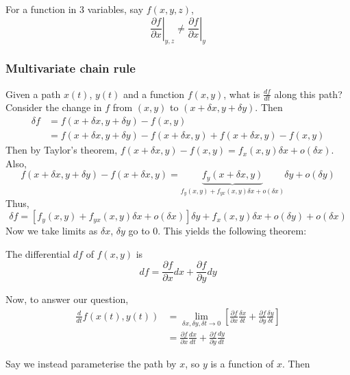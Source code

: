 \documentclass{../../template/note}
\begin{document}
    \begin{remark*}
        For a function in 3 variables, say \(f(x, y, z)\),
        \[
            \left.\frac{\partial f}{\partial x}\right|_{y,z} \neq \left.\frac{\partial f}{\partial x}\right|_y
        \]        
    \end{remark*}
    
    \subsubsection{Multivariate chain rule}

    Given a path \(x(t)\), \(y(t)\) and a function \(f(x, y)\), what is \(\frac{df}{dt}\) along this path? Consider the change in \(f\) from \((x, y)\) to \((x + \delta x, y + \delta y)\). Then
    \begin{align*}
        \delta f &= f(x + \delta x, y + \delta y) - f(x, y) \\
        &= f(x + \delta x, y + \delta y) - f(x + \delta x, y) + f(x + \delta x, y) - f(x, y)
    \end{align*}
    Then by Taylor's theorem, \(f(x + \delta x, y) - f(x, y) = f_x(x, y) \delta x + o(\delta x)\). Also,
    \[
        f(x + \delta x, y + \delta y) - f(x + \delta x, y) = \underbrace{f_y(x + \delta x, y)}_{f_y(x, y) + f_{yx}(x, y) \delta x + o(\delta x)}\delta y + o(\delta y)
    \]
    Thus,
    \[
        \delta f = \left[f_y(x, y) + f_{yx}(x, y) \delta x + o(\delta x)\right]\delta y + f_x(x,y) \delta x + o(\delta y) + o(\delta x)
    \]
    Now we take limits as \(\delta x\), \(\delta y\) go to 0. This yields the following theorem:
    
    \begin{theorem}
        The differential \(df\) of \(f(x, y)\) is
        \[
            df = \frac{\partial f}{\partial x} dx + \frac{\partial f}{\partial y} dy
        \]
    \end{theorem}
    Now, to answer our question,
    \begin{align*}
        \frac{d}{dt} f(x(t), y(t)) &= \lim_{\delta x, \delta y, \delta t \to 0} \left[\frac{\partial f}{\partial x}\frac{\delta x}{\delta t} + \frac{\partial f}{\partial y}\frac{\delta y}{\delta t}\right] \\
        &= \frac{\partial f}{\partial x}\frac{dx}{dt} + \frac{\partial f}{\partial y}\frac{dy}{dt}
    \end{align*}
    
    Say we instead parameterise the path by \(x\), so \(y\) is a function of \(x\). Then
\end{document}
